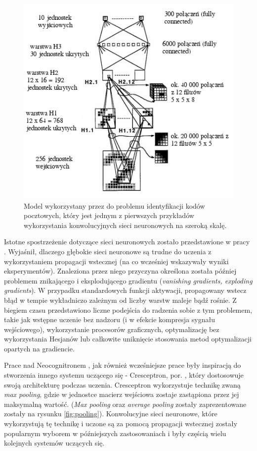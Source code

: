 \documentclass[12pt,a4paper,twoside]{article}
\begin{document}
\begin{figure}[h]
  \centering
\includegraphics[scale=0.6]{../obrazy/fig:lecunmnist.png}
\caption{Model wykorzystany przez \citet{lecun1989b} do problemu identyfikacji kodów pocztowych, który jest jednym z pierwszych przykładów wykorzystania konwolucyjnych sieci neuronowych na szeroką skalę. \label{fig:lecunmnist}}
\end{figure}

Istotne spostrzeżenie dotyczące sieci neuronowych zostało przedstawione w pracy \citet{hochreiter1991}. Wyjaśnił, dlaczego głębokie sieci neuronowe są trudne do uczenia z wykorzystaniem propagacji wstecznej (na co wcześniej wskazywały wyniki eksperymentów). Znaleziona przez niego przyczyna określona została później problemem znikającego i eksplodującego gradientu (\textit{vanishing gradients, exploding gradients}). W przypadku standardowych funkcji aktywacji, propagowany wstecz błąd w tempie wykładniczo zależnym od liczby warstw maleje bądź rośnie. Z biegiem czasu przedstawiono liczne podejścia do radzenia sobie z tym problemem, takie jak wstępne uczenie bez nadzoru (i w efekcie kompresja sygnału wejściowego), wykorzystanie procesorów graficznych, optymalizację bez wykorzystania Hesjanów lub całkowite uniknięcie stosowania metod optymalizacji opartych na gradiencie.

Prace nad Neocognitronem \citep{fukushima1980}, jak również wcześniejsze prace \citep{ivakhnenko1968} były inspiracją do stworzenia innego systemu uczącego się - Cresceptron, por. \citet{weng1992}, który dostosowuje swoją architekturę podczas uczenia. Cresceptron wykorzystuje technikę zwaną \textit{max pooling}, gdzie w jednostce macierz wejściowa zostaje zastąpiona przez jej maksymalną wartość. (\textit{Max pooling} oraz \textit{average pooling} zostały zaprezentowane zostały na rysunku \ref{fig:pooling}). Konwolucyjne sieci neuronowe, które wykorzystują tę technikę i uczone są za pomocą propagacji wstecznej zostały popularnym wyborem w późniejszych zastosowaniach i były częścią wielu kolejnych systemów uczących się.
\end{document}
